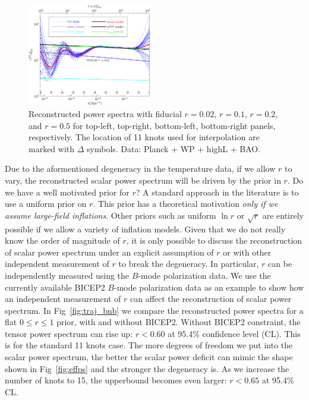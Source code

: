 \documentclass[a4paper,11pt]{article}
\def \halffigwidth{0.48\textwidth}
\begin{document}
\begin{figure}
  \includegraphics[width=\halffigwidth]{nobicep_spline0_p11_r0d5_power_traj.pdf}
  \caption{Reconstructed power spectra with fiducial $r = 0.02$, $r=0.1$, $r=0.2$, and $r=0.5$ for top-left, top-right, bottom-left, bottom-right panels, respectively. The location of 11 knots used for interpolation are marked with $\Delta$ symbols. Data: Planck + WP + highL + BAO. \label{fig:traj_power_fixr}}
\end{figure}


Due to the aformentioned degeneracy in the temperature data, if we allow $r$ to vary, the reconstructed scalar power spectrum will be driven by the prior in $r$. Do we have a well motivated prior for $r$? A standard approach in the literature is to use a uniform prior on $r$. This prior has a theoretical motivation {\it only if we assume large-field inflations}. Other priors such as uniform $\ln r$ or $\sqrt{r}$ are entirely possible if we allow a variety of inflation models. Given that we do not really know the order of magnitude of $r$, it is only possible to discuss the reconstruction of scalar power spectrum under an explicit assumption of $r$ or with other independent measurement of $r$ to break the degeneracy. In particular, $r$ can be independently measured using the $B$-mode polarization data. We use the currently available BICEP2 $B$-mode polarization data as an example to show how an independent measurement of $r$ can affect the reconstruction of scalar power spectrum. In Fig~\ref{fig:traj_bnb} we compare the reconstructed power spectra for a flat $0\le r \le 1$ prior, with and without BICEP2. Without BICEP2 constraint, the tensor power spectrum can rise up: $r < 0.60$ at 95.4\% confidence level (CL). This is for the standard 11 knots case. The more degrees of freedom we put into the scalar power spectrum, the better the scalar power deficit can mimic the shape shown in Fig~\ref{fig:effps} and the stronger the degeneracy is. As we increase the number of knots to 15, the upperbound becomes even larger: $ r < 0.65$ at 95.4\% CL. 
\end{document}
